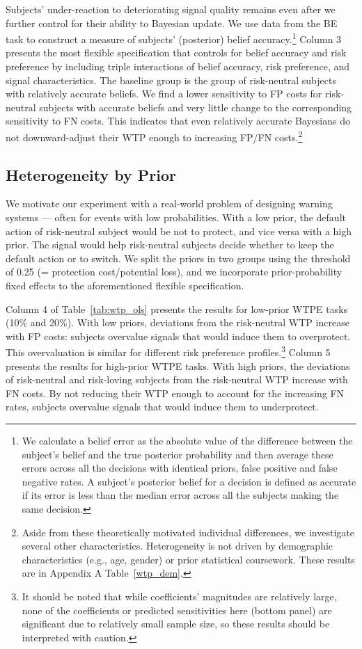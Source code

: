 \documentclass[12pt,a4paper]{article}
\begin{document}
Subjects' under-reaction to deteriorating signal quality remains even after we further control for their ability to Bayesian update. We use data from the BE task to construct a measure of subjects' (posterior) belief accuracy.\footnote{We calculate a belief error as the absolute value of the difference between the subject's belief and the true posterior probability and then average these errors across all the decisions with identical priors, false positive and false negative rates. A subject's posterior belief for a decision is defined as accurate if its error is less than the median error across all the subjects making the same decision.} Column 3 presents the most flexible specification that controls for belief accuracy and risk preference by including triple interactions of belief accuracy, risk preference, and signal characteristics. The baseline group is the group of risk-neutral subjects with relatively accurate beliefs. We find a lower sensitivity to FP costs for risk-neutral subjects with accurate beliefs and very little change to the corresponding sensitivity to FN costs. This indicates that even relatively accurate Bayesians do not downward-adjust their WTP enough to increasing FP/FN costs.\footnote{Aside from these theoretically motivated individual differences, we investigate several other characteristics. Heterogeneity is not driven by demographic characteristics (e.g., age, gender) or prior statistical coursework.  These results are in Appendix A Table~\ref{wtp_dem}.}
  

\subsection{Heterogeneity by Prior}

We motivate our experiment with a real-world problem of designing warning systems --- often for events with low probabilities. With a low prior, the default action of risk-neutral subject would be not to protect, and vice versa with a high prior. The signal would help risk-neutral subjects decide whether to keep the default action or to switch. We split the priors in two groups using the threshold of 0.25 (= protection cost/potential loss), and we incorporate prior-probability fixed effects to the aforementioned flexible specification. 

Column 4 of Table~\ref{tab:wtp_ols} presents the results for low-prior WTPE tasks (10\% and 20\%). With low priors, deviations from the risk-neutral WTP increase with FP costs: subjects overvalue signals that would induce them to overprotect. This overvaluation is similar for different risk preference profiles.\footnote{It should be noted that while coefficients' magnitudes are relatively large, none of the coefficients or predicted sensitivities here (bottom panel) are significant due to relatively small sample size, so these results should be interpreted with caution.}  Column 5 presents the results for high-prior WTPE tasks. With high priors, the deviations of risk-neutral and risk-loving subjects from the risk-neutral WTP increase with FN costs. By not reducing their WTP enough to account for the increasing FN rates, subjects overvalue signals that would induce them to underprotect. 
\end{document}
